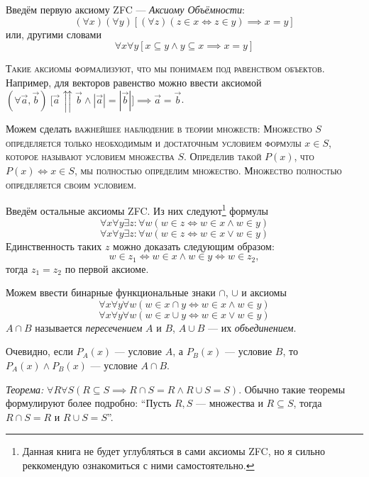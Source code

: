 Введём первую аксиому ZFC --- {\it Аксиому Объёмности}:
\begin{equation}\label{eq:ax_ext_1}
	(\forall x)(\forall y)[(\forall z)(z\in x\iff z\in y)\implies x=y]
\end{equation}
или, другими словами
\begin{equation}\label{eq:ax_ext_2}
	\forall x\forall y[x\subseteq y\land y\subseteq x\implies x=y]
\end{equation}

\textsc{Такие аксиомы формализуют, что мы понимаем под равенством объектов.}
Например, для векторов равенство можно ввести аксиомой
$(\forall \vec{a},\vec{b})~
	\big[\vec{a}\upuparrows\vec{b}\land|\vec{a}|=|\vec{b}|\big]
	\implies \vec{a}=\vec{b}$.

Можем сделать \textsc{важнейшее наблюдение в теории множеств: Множество $S$
	определяется только необходимым и достаточным условием формулы $x\in S$,
	которое называют условием множества $S$.
	Определив такой $P(x)$, что $P(x)\iff x\in S$, мы полностью определим множество.
	Множество полностью определяется своим условием.}

Введём остальные аксиомы ZFC. Из них следуют\footnote{
	Данная книга не будет углубляться в сами аксиомы ZFC, но я сильно реккомендую
	ознакомиться с ними самостоятельно.}
формулы
\[
	\forall x\forall y\exists z:\forall w(w\in z\iff w\in x\land w\in y)
\]
\[
	\forall x\forall y\exists z:\forall w(w\in z\iff w\in x\lor w\in y)
\]
Единственность таких $z$ можно доказать следующим образом:
\[
	w\in z_1\iff w\in x\land w\in y\iff w\in z_2,
\]
тогда $z_1=z_2$ по первой аксиоме.

Можем ввести бинарные функциональные знаки $\cap$, $\cup$ и аксиомы
\[
	\forall x\forall y\forall w(w\in x\cap y\iff w\in x\land w\in y)
\]
\[
	\forall x\forall y\forall w(w\in x\cup y\iff w\in x\lor w\in y)
\]
$A\cap B$ называется {\it пересечением} $A$ и $B$,
$A\cup B$ --- их {\it объединением}.

Очевидно, если $P_{A}(x)$ --- условие $A$, а $P_{B}(x)$ --- условие $B$,
то $P_{A}(x)\land P_{B}(x)$ --- условие $A\cap B$.

\vspace{1em}
{\it Теорема:} ${\forall R\forall S(R\subseteq S\implies R\cap S=R\land R\cup S=S)}$.
Обычно такие теоремы формулируют более подробно:
``Пусть $R,S$ --- множества и $R\subseteq S$, тогда $R\cap S=R$ и $R\cup S=S$''.


